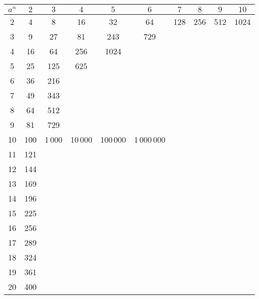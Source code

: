 \documentclass[12pt,twoside]{article}
\begin{document}
\begin{center}
\begin{tabular}{|c|c|c|c|c|c|c|c|c|c|}
  \hline
  $a^n$ & $2$ & $3$ & $4$ & $5$ & $6$ & $7$ & $8$ & $9$ & $10$\\
  \hline
  2     & 4   & 8   & 16  & 32  & 64  & 128 & 256 & 512 & 1024\\
  \cline{1-10}
  3     & 9   & 27  & 81  & 243 & 729\\
  \cline{1-6}
  4     & 16  & 64  & 256 & 1024\\
  \cline{1-5}
  5     & 25  & 125 & 625\\
  \cline{1-4}
  6     & 36  & 216\\
  \cline{1-3}
  7     & 49  & 343\\
  \cline{1-3}
  8     & 64  & 512\\
  \cline{1-3}
  9     & 81  & 729\\
  \cline{1-6}
  10    & 100  & 1\,000 & 10\,000 & 100\,000 & 1\,000\,000\\
  \cline{1-6}
  11    & 121\\
  \cline{1-2}
  12    & 144\\
  \cline{1-2}
  13    & 169\\
  \cline{1-2}
  14    & 196\\
  \cline{1-2}
  15    & 225\\
  \cline{1-2}
  16    & 256\\
  \cline{1-2}
  17    & 289\\
  \cline{1-2}
  18    & 324\\
  \cline{1-2}
  19    & 361\\
  \cline{1-2}
  20    & 400\\
  \cline{1-2}
\end{tabular}
\end{center}


\end{document}
